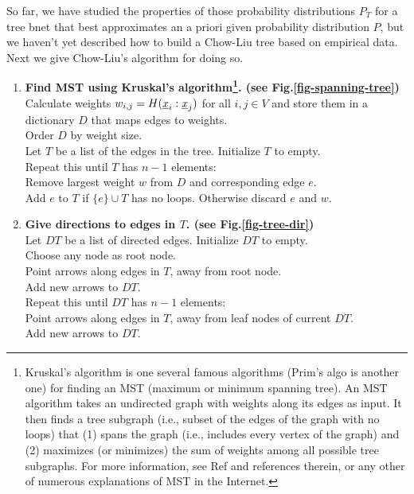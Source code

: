 So far,
we have
studied the properties
of those 
probability 
distributions
$P_T$
for a tree bnet
that 
best
approximates
an a priori given
probability
distribution $P$,
but
we haven't yet
described
how to 
build a Chow-Liu tree
based on
empirical data.
Next we give
Chow-Liu's algorithm
for doing so.


\begin{enumerate}
\item {\bf Find MST using Kruskal's 
algorithm\footnote{Kruskal's algorithm is 
one several famous algorithms (Prim's
algo is another one) for
finding an MST (maximum or
minimum spanning tree).  
An MST algorithm
 takes an
undirected graph 
with
weights along its edges as input.
It then
 finds a tree subgraph (i.e., subset
of the edges of the graph
with no loops) that
(1) spans the graph
(i.e., includes every vertex
of the graph) and (2)
maximizes (or
minimizes)
the
 sum of weights among all possible
 tree subgraphs.
For more information,
see Ref\cite{wiki-spanning-tree} and references
therein, or any other
of numerous explanations
of MST in the Internet.}.
(see Fig.\ref{fig-spanning-tree})}\\
Calculate weights $w_{i, j}=
H({\underline{x}}_i:{\underline{x}}_j)$ for all
$i, j\in V$  and store them 
in a dictionary
 $D$
that maps edges to weights.\\
Order $D$ by weight size.\\
Let $T$ be a list of the edges in the tree. 
Initialize $T$ to  empty.\\
Repeat this until $T$ has $n-1$ elements:\\
\hspace*{1cm}Remove largest weight $w$ from $D$
and corresponding edge $e$.\\
\hspace*{1cm}Add $e$ to $T$ if $\{e\}\cup T$
has no loops. Otherwise discard $e$ and $w$.

\item{\bf  Give directions to edges in $T$.
(see Fig.\ref{fig-tree-dir})}\\
Let $DT$ be a list of directed edges.
Initialize $DT$ to empty.\\
Choose any node as root node.\\
Point arrows along edges in $T$,
away 
from root node.\\
Add new arrows to $DT$.\\ 
Repeat this until $DT$ has $n-1$ elements:\\
\hspace*{1cm}Point arrows
along edges in $T$,
away from 
leaf nodes of current  $DT$.\\
\hspace*{1cm}Add new arrows to $DT$.
\end{enumerate}

